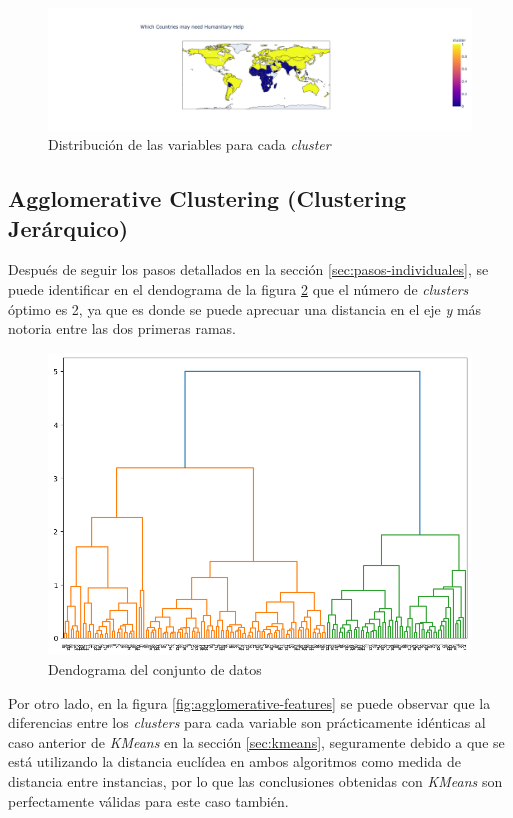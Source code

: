 \documentclass{article}
\begin{document}
\vspace{-10pt}

\begin{figure}[H]
  \centering
  \includegraphics[width=\linewidth]{../images/kmeans/map.png}
  \caption{Distribución de las variables para cada \textit{cluster}}
  \label{fig:kmeans-map}
\end{figure}

\subsection{Agglomerative Clustering (Clustering Jerárquico)}
\noindent Después de seguir los pasos detallados en la sección \ref{sec:pasos-individuales}, se puede identificar en el dendograma de la figura \ref{fig:dendogram} que el número de \textit{clusters} óptimo es 2,
ya que es donde se puede aprecuar una distancia en el eje \textit{y} más notoria entre las dos primeras ramas.

\begin{figure}[H]
  \centering
  \includegraphics[width=0.4\linewidth]{../images/agglomerative/dendogram.png}
  \caption{Dendograma del conjunto de datos}
  \label{fig:dendogram}
\end{figure}

\noindent Por otro lado, en la figura \ref{fig:agglomerative-features} se puede observar que la diferencias entre los \textit{clusters} para cada variable son prácticamente idénticas al caso anterior de \textit{KMeans} en la sección \ref{sec:kmeans}, seguramente debido a que se está utilizando la distancia euclídea en ambos algoritmos como medida de distancia entre instancias, por lo que las conclusiones obtenidas con \textit{KMeans} son perfectamente válidas para este caso también.\\
\end{document}
